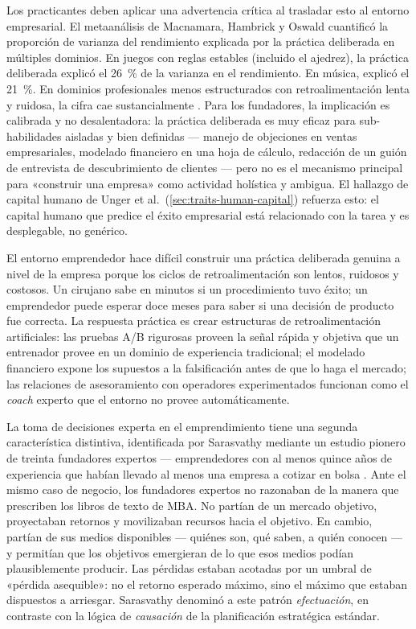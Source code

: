 Los practicantes deben aplicar una advertencia crítica al trasladar esto al entorno empresarial.
El metaanálisis de Macnamara, Hambrick y Oswald cuantificó la proporción de varianza del
rendimiento explicada por la práctica deliberada en múltiples dominios. %
En juegos con reglas estables (incluido el ajedrez), la práctica deliberada explicó el
\qty{26}{\percent} de la varianza en el rendimiento. En música, explicó el \qty{21}{\percent}.
En dominios profesionales menos estructurados con retroalimentación lenta y ruidosa, la cifra
cae sustancialmente \parencite{macnamara2014practice}. Para los fundadores, la implicación es
calibrada y no desalentadora: la práctica deliberada es muy eficaz para sub-habilidades
aisladas y bien definidas --- manejo de objeciones en ventas empresariales, modelado financiero
en una hoja de cálculo, redacción de un guión de entrevista de descubrimiento de clientes ---
pero no es el mecanismo principal para «construir una empresa» como actividad holística y
ambigua. El hallazgo de capital humano de Unger et al.\ (\cref{sec:traits-human-capital})
refuerza esto: el capital humano que predice el éxito empresarial está relacionado con la tarea
y es desplegable, no genérico.

El entorno emprendedor hace difícil construir una práctica deliberada genuina a nivel de la
empresa porque los ciclos de retroalimentación son lentos, ruidosos y costosos. Un cirujano sabe
en minutos si un procedimiento tuvo éxito; un emprendedor puede esperar doce meses para saber si
una decisión de producto fue correcta. La respuesta práctica es crear estructuras de
retroalimentación artificiales: las pruebas A/B rigurosas proveen la señal rápida y objetiva que
un entrenador provee en un dominio de experiencia tradicional; el modelado financiero expone los
supuestos a la falsificación antes de que lo haga el mercado; las relaciones de asesoramiento
con operadores experimentados funcionan como el \emph{coach} experto que el entorno no provee
automáticamente.

La toma de decisiones experta en el emprendimiento tiene una segunda característica distintiva,
identificada por Sarasvathy mediante un estudio pionero de treinta fundadores expertos ---
emprendedores con al menos quince años de experiencia que habían llevado al menos una empresa a
cotizar en bolsa \parencite{sarasvathy2001causation}. Ante el mismo caso de negocio, los
fundadores expertos no razonaban de la manera que prescriben los libros de texto de MBA. No
partían de un mercado objetivo, proyectaban retornos y movilizaban recursos hacia el objetivo.
En cambio, partían de sus medios disponibles --- quiénes son, qué saben, a quién conocen --- y
permitían que los objetivos emergieran de lo que esos medios podían plausiblemente producir. Las
pérdidas estaban acotadas por un umbral de «pérdida asequible»: no el retorno esperado máximo,
sino el máximo que estaban dispuestos a arriesgar. Sarasvathy denominó a este patrón
\emph{efectuación}, en contraste con la lógica de \emph{causación} de la planificación
estratégica estándar.

